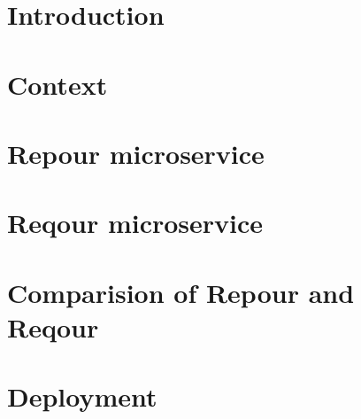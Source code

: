 \documentclass[
  digital,     %
  oneside,     %
  nosansbold,  %
  nocolorbold, %
  nolof,         %
  nolot,         %
]{fithesis4}
\begin{document}
\chapter*{Introduction}
\label{chap:introduction}


\chapter{Context}
\label{chap:context}


\chapter{Repour microservice}
\label{chap:repour}


\chapter{Reqour microservice}
\label{chap:reqour}


\chapter{Comparision of Repour and Reqour}


\chapter{Deployment}
\label{chap:deployment}

\end{document}
